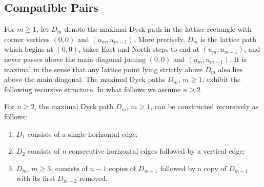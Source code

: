 \documentclass[smallextended,envcountsect,envcountsame]{svjour3}
\numberwithin{equation}{section}
\begin{document}
\bigskip


\subsection{Compatible Pairs}

For $m\ge1$, let $D_m$ denote the maximal Dyck path in the lattice rectangle with corner vertices $(0,0)$ and $(u_m,u_{m-1})$.  
More precisely, $D_m$ is the lattice path which begins at $(0,0)$, takes East and North steps to end at $(u_m,u_{m-1})$, and never passes above the main diagonal joining $(0,0)$ and $(u_m,u_{m-1})$.  
It is maximal in the sense that any lattice point lying strictly above $D_m$ also lies above the main diagonal.  
The maximal Dyck paths $D_m$, $m\ge1$, exhibit the following recursive structure.
In what follows we assume $n\ge2$.
\begin{theorem}
  \label{th:dyck path recursion}
  \cite[Corollary 2.4]{rupel}
  For $n\ge2$, the maximal Dyck path $D_m$, $m\ge1$, can be constructed recursively as follows:
  \begin{enumerate}
    \item $D_1$ consists of a single horizontal edge;
    \item $D_2$ consists of $n$ consecutive horizontal edges followed by a vertical edge;
    \item $D_m$, $m\ge3$, consists of $n-1$ copies of $D_{m-1}$ followed by a copy of $D_{m-1}$ with its first $D_{m-2}$ removed.
  \end{enumerate}
\end{theorem}
\end{document}
